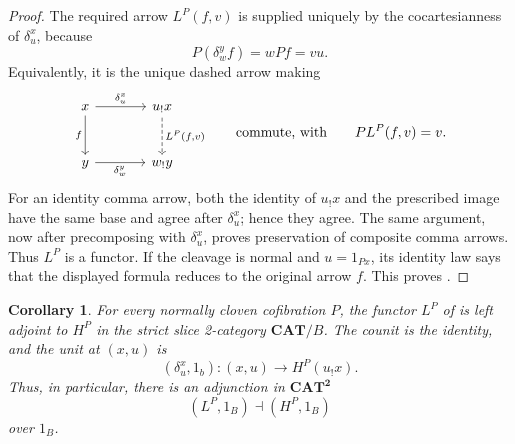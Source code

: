 \documentclass[11pt]{article}
\theoremstyle{plain}
\newtheorem{corollary}[theorem]{Corollary}
\theoremstyle{definition}
\theoremstyle{remark}
\newcommand{\CAT}{\mathbf{CAT}}
\numberwithin{equation}{section}
\begin{document}
\begin{proof}
The required arrow $L^{P}(f,v)$ is supplied uniquely by the
cocartesianness of $\delta^{x}_{u}$, because
\begin{equation*}
P(\delta^{y}_{w}f)=wPf=vu.
\end{equation*}
Equivalently, it is the unique dashed arrow making
\begin{equation*}
\begin{tikzcd}[column sep=large,row sep=large]
x \arrow[r,"\delta^x_u"] \arrow[d,"f"']
  & u_!x \arrow[d,dashed,"{L^P(f,v)}"] \\
y \arrow[r,"\delta^y_w"']
  & w_!y
\end{tikzcd}
\qquad\text{commute, with}\qquad PL^P(f,v)=v.
\end{equation*}
For an identity comma arrow, both the identity of $u_{!}x$ and the
prescribed image have the same base and agree after
$\delta^{x}_{u}$; hence they agree.  The same argument, now after
precomposing with $\delta^{x}_{u}$, proves preservation of composite
comma arrows.  Thus $L^{P}$ is a functor.  If the cleavage is normal
and $u=1_{Px}$, its identity law says that the displayed formula
reduces to the original arrow $f$.  This proves .
\end{proof}

\begin{corollary}\label{cor:split-adjunction}
For every normally cloven cofibration $P$, the functor $L^{P}$ of
 is left adjoint to $H^{P}$ in the
strict slice 2-category $\CAT/B$.  The counit is the identity, and the
unit at $(x,u)$ is
\begin{equation}
(\delta^{x}_{u},1_b)\colon(x,u)\longrightarrow
  H^{P}(u_{!}x)
  \label{eq:unit-LH}.
\end{equation}
Thus, in particular, there is an adjunction in $\CAT^{\mathbf 2}$
\begin{equation}
(L^{P},1_B)\dashv(H^{P},1_B)
  \label{eq:LP-adjunction}
\end{equation}
over $1_B$.
\end{corollary}
\end{document}
